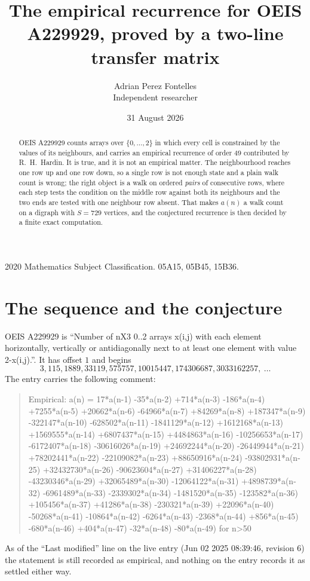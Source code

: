 \documentclass[11pt,a4paper]{article}
\title{The empirical recurrence for OEIS A229929, proved by a two-line transfer matrix}
\author{Adrian Perez Fontelles\\ \small Independent researcher}
\date{31 August 2026}
\theoremstyle{plain}
\theoremstyle{definition}
\begin{document}
\maketitle

\begin{abstract}
OEIS A229929 counts arrays over $\{0,\dots,2\}$ in which every cell is constrained by the
values of its neighbours, and carries an empirical recurrence of order $49$ contributed
by R.~H.~Hardin. It is true, and it is not an empirical matter. The neighbourhood reaches one
row up and one row down, so a single row is not enough state and a plain walk count
is wrong; the right object is a walk on ordered \emph{pairs} of consecutive rows, where
each step tests the condition on the middle row against both its neighbours and the two
ends are tested with one neighbour row absent. That makes $a(n)$ a walk count on a digraph
with $S=729$ vertices, and the conjectured recurrence is then decided by a finite exact
computation.
\end{abstract}

\noindent\small 2020 Mathematics Subject Classification. 05A15, 05B45, 15B36.\normalsize

\section{The sequence and the conjecture}

OEIS A229929 is ``Number of nX3 0..2 arrays x(i,j) with each element horizontally, vertically or antidiagonally next to at least one element with value 2-x(i,j).''. It has offset $1$ and begins
\[
3, 115, 1889, 33119, 575757, 10015447, 174306687, 3033162257,\ \dots
\]
The entry carries the following comment:
\begin{quote}\small
Empirical: a(n) = 17*a(n-1) -35*a(n-2) +714*a(n-3) -186*a(n-4) +7255*a(n-5) +20662*a(n-6) -64966*a(n-7) +84269*a(n-8) +187347*a(n-9) -322147*a(n-10) -628502*a(n-11) -1841129*a(n-12) +1612168*a(n-13) +1569555*a(n-14) +6807437*a(n-15) +4484863*a(n-16) -10256653*a(n-17) -6172407*a(n-18) -30616026*a(n-19) +24692244*a(n-20) -26449944*a(n-21) +78202441*a(n-22) -22109082*a(n-23) +88650916*a(n-24) -93802931*a(n-25) +32432730*a(n-26) -90623604*a(n-27) +31406227*a(n-28) -43230346*a(n-29) +32065489*a(n-30) -12064122*a(n-31) +4898739*a(n-32) -6961489*a(n-33) -2339302*a(n-34) -1481520*a(n-35) -123582*a(n-36) +105456*a(n-37) +41286*a(n-38) -230321*a(n-39) +22096*a(n-40) -50268*a(n-41) -10864*a(n-42) -6264*a(n-43) -2368*a(n-44) +856*a(n-45) -680*a(n-46) +404*a(n-47) -32*a(n-48) -80*a(n-49) for n>50
\end{quote}
As of the ``Last modified'' line on the live entry (Jun 02 2025 08:39:46, revision 6) the statement is
still recorded as empirical, and nothing on the entry records it as settled either way.
\end{document}
